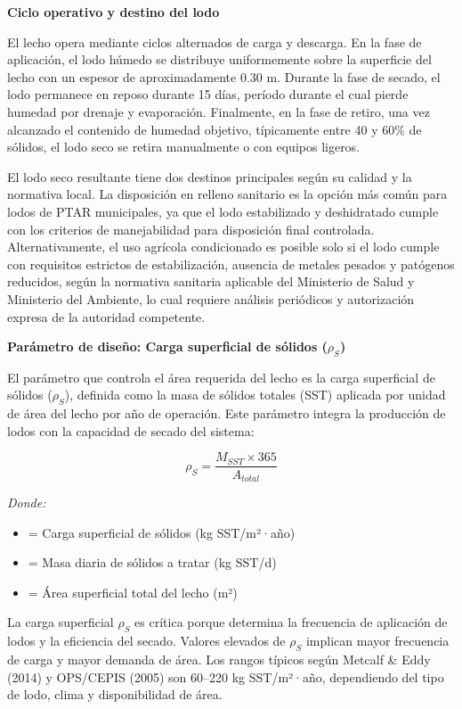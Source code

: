 \textbf{Ciclo operativo y destino del lodo}

El lecho opera mediante ciclos alternados de carga y descarga. En la fase de aplicación, el lodo húmedo se distribuye uniformemente sobre la superficie del lecho con un espesor de aproximadamente 0.30 m. Durante la fase de secado, el lodo permanece en reposo durante 15 días, período durante el cual pierde humedad por drenaje y evaporación. Finalmente, en la fase de retiro, una vez alcanzado el contenido de humedad objetivo, típicamente entre 40 y 60\% de sólidos, el lodo seco se retira manualmente o con equipos ligeros.

El lodo seco resultante tiene dos destinos principales según su calidad y la normativa local. La disposición en relleno sanitario es la opción más común para lodos de PTAR municipales, ya que el lodo estabilizado y deshidratado cumple con los criterios de manejabilidad para disposición final controlada. Alternativamente, el uso agrícola condicionado es posible solo si el lodo cumple con requisitos estrictos de estabilización, ausencia de metales pesados y patógenos reducidos, según la normativa sanitaria aplicable del Ministerio de Salud y Ministerio del Ambiente, lo cual requiere análisis periódicos y autorización expresa de la autoridad competente.

\textbf{Parámetro de diseño: Carga superficial de sólidos ($\rho_S$)}

El parámetro que controla el área requerida del lecho es la carga superficial de sólidos ($\rho_S$), definida como la masa de sólidos totales (SST) aplicada por unidad de área del lecho por año de operación. Este parámetro integra la producción de lodos con la capacidad de secado del sistema:

\begin{equation}
\rho_S = \frac{M_{SST} \times 365}{A_{total}}
\end{equation}

\textit{Donde:}
\begin{itemize}[noitemsep,leftmargin=2em]
    \item[$\rho_S$] = Carga superficial de sólidos (kg SST/m²·año)
    \item[$M_{SST}$] = Masa diaria de sólidos a tratar (kg SST/d)
    \item[$A_{total}$] = Área superficial total del lecho (m²)
\end{itemize}

La carga superficial $\rho_S$ es crítica porque determina la frecuencia de aplicación de lodos y la eficiencia del secado. Valores elevados de $\rho_S$ implican mayor frecuencia de carga y mayor demanda de área. Los rangos típicos según Metcalf \& Eddy (2014) y OPS/CEPIS (2005) son 60--220 kg SST/m²·año, dependiendo del tipo de lodo, clima y disponibilidad de área.

